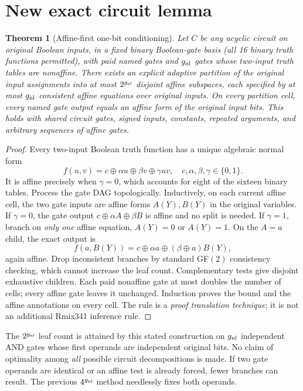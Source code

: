 \documentclass[11pt]{article}
\newtheorem{theorem}{Theorem}
\begin{document}
\section*{New exact circuit lemma}
\begin{theorem}[Affine-first one-bit conditioning]
Let $C$ be any acyclic circuit on original Boolean inputs, in a fixed binary Boolean-gate basis (all 16 binary truth functions permitted), with paid named gates and $g_{\rm nl}$ gates whose two-input truth tables are nonaffine. There exists an \emph{explicit adaptive partition} of the original input assignments into at most $2^{g_{\rm nl}}$ disjoint affine subspaces, each specified by at most $g_{\rm nl}$ consistent affine equations over original inputs. On every partition cell, every named gate output equals an affine form of the original input bits. This holds with shared circuit gates, signed inputs, constants, repeated arguments, and arbitrary sequences of affine gates.
\end{theorem}
\begin{proof}
Every two-input Boolean truth function has a unique algebraic normal form
\[
f(u,v)=c\oplus\alpha u\oplus\beta v\oplus\gamma uv,
\quad c,\alpha,\beta,\gamma\in\{0,1\}.
\]
It is affine precisely when $\gamma=0$, which accounts for eight of the sixteen binary tables. Process the gate DAG topologically. Inductively, on each current affine cell, the two gate inputs are affine forms $A(Y),B(Y)$ in the original variables. If $\gamma=0$, the gate output $c\oplus\alpha A\oplus\beta B$ is affine and no split is needed. If $\gamma=1$, branch on \emph{only one} affine equation, $A(Y)=0$ or $A(Y)=1$. On the $A=a$ child, the exact output is
\[
f(a,B(Y))=c\oplus\alpha a\oplus(\beta\oplus a)B(Y),
\]
again affine. Drop inconsistent branches by standard GF$(2)$ consistency checking, which cannot increase the leaf count. Complementary tests give disjoint exhaustive children. Each paid nonaffine gate at most doubles the number of cells; every affine gate leaves it unchanged. Induction proves the bound and the affine annotations on every cell. The rule is a \emph{proof translation technique}; it is not an additional Rmix341 inference rule.
\end{proof}
The $2^{g_{\rm nl}}$ leaf count is attained by this stated construction on $g_{\rm nl}$ independent AND gates whose first operands are independent original bits. No claim of optimality among \emph{all} possible circuit decompositions is made. If two gate operands are identical or an affine test is already forced, fewer branches can result. The previous $4^{g_{\rm nl}}$ method needlessly fixes both operands.
\end{document}
